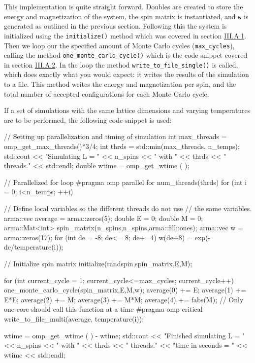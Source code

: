 \documentclass[reprint,english,notitlepage]{revtex4-1}  %
\begin{document}
This implementation is quite straight forward. Doubles are created to store the energy and magnetization of the system, the spin matrix is instantiated, and \verb+w+ is generated as outlined in the previous section. Following this the system is initialized using the \verb+initialize()+ method which was covered in section \hyperref[sec:III:a:i]{III.A.1}. Then we loop our the specified amount of Monte Carlo cycles (\verb+max_cycles+), calling the method \verb+one_monte_carlo_cycle()+ which is the code snippet covered in section \hyperref[sec:III:a:ii]{III.A.2}. In the loop the method \verb+write_to_file_single()+ is called, which does exactly what you would expect: it writes the results of the simulation to a file. This method writes the energy and magnetization per spin, and the total number of accepted configurations for each Monte Carlo cycle. 

If a set of simulations with the same lattice dimensions and varying temperatures are to be performed, the following code snippet is used:

\begin{cpp}
// Setting up parallelization and timing of simulation
int max_threads = omp_get_max_threads()*3/4;
int thrds = std::min(max_threads, n_temps);
std::cout << "Simulating L = " << n_spins << " with " 
		  << thrds << " threads." << std::endl;
double wtime = omp_get_wtime ( );

// Parallelized for loop
#pragma omp parallel for num_threads(thrds)
for (int i = 0; i<n_temps; ++i) {
  // Define local variables so the different threads do not use 
  // the same variables.
  arma::vec average = arma::zeros(5);
  double E = 0;
  double M = 0;
  arma::Mat<int> spin_matrix(n_spins,n_spins,arma::fill::ones);
  arma::vec w = arma::zeros(17);
  for (int de = -8; de<= 8; de+=4) {
    w(de+8) = exp(-de/temperature(i));
  }

  // Initialize spin matrix
  initialize(randspin,spin_matrix,E,M);

  for (int current_cycle = 1; current_cycle<=max_cycles; 
  	   current_cycle++){
    one_monte_carlo_cycle(spin_matrix,E,M,w);
    average(0) += E;
    average(1) += E*E;
    average(2) += M;
    average(3) += M*M;
    average(4) += fabs(M);
  }
  // Only one core should call this function at a time
  #pragma omp critical
  write_to_file_multi(average, temperature(i));
}
wtime = omp_get_wtime ( ) - wtime;
std::cout << "Finished simulating L = " << n_spins << " with " 
	      << thrds << " threads."
  		  << "\nElapsed time in seconds = " << wtime << std::endl;
\end{cpp} 
\end{document}

